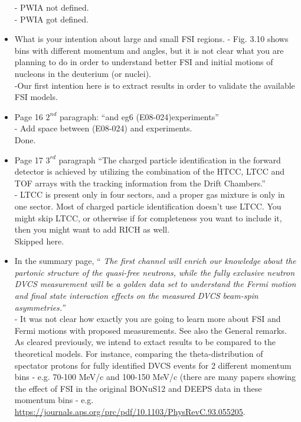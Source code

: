 \begin{itemize}
- PWIA not defined.\\
     {\color{red} - PWIA got defined. }

  
\item What is your intention about large and small FSI regions. 
  - Fig. 3.10 shows bins with different momentum and angles, but it is not 
    clear what you are planning to do in order to understand better FSI and 
    initial motions of nucleons in the deuterium (or nuclei).\\
     {\color{red} -Our first intention here is to extract results in order to 
     validate the available FSI models. }
  
  \item Page 16 $2^{nd}$ paragraph: ``and eg6 (E08-024)experiments'' \\
  - Add space between (E08-024) and experiments.\\
     {\color{red} Done.}
  
 \item Page 17 $3^{rd}$ paragraph ``The charged particle identification in the 
    forward detector is achieved by utilizing the combination of the HTCC, LTCC 
    and TOF arrays with the tracking information from the Drift Chambers.'' \\
- LTCC is present only in four sectors, and a proper gas mixture is only in one 
  sector. Most of charged particle identification doesn't use LTCC. You might 
  skip LTCC, or otherwise if for completeness you want to include it, then you 
  might want to add RICH as well.\\
     {\color{red} Skipped here.}


\item In the summary page, ``\textit{ The first channel will enrich our 
   knowledge about the partonic structure of the quasi-free neutrons, while the 
   fully exclusive neutron DVCS measurement will be a golden data set to 
   understand the Fermi motion and final state interaction effects on the 
   measured DVCS beam-spin asymmetries.''}\\
- It was not clear how exactly you are going to learn more about FSI and Fermi 
  motions with proposed measurements. See also the General remarks.\\

     {\color{red} As cleared previously, we intend to extact results to be 
     compared to the theoretical models. For instance, comparing the 
     theta-distribution of spectator protons for fully identified DVCS events 
     for 2 different momentum bins - e.g. 70-100 MeV/c and 100-150 MeV/c (there 
     are many papers showing the effect of FSI in the original BONuS12 and 
     DEEPS data in these momentum bins - e.g.  
     \url{https://journals.aps.org/prc/pdf/10.1103/PhysRevC.93.055205}.}

\end{itemize}
 


